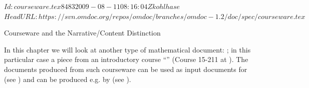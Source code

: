 \svnInfo $Id: courseware.tex 8483 2009-08-11 08:16:04Z kohlhase $
\svnKeyword $HeadURL: https://svn.omdoc.org/repos/omdoc/branches/omdoc-1.2/doc/spec/courseware.tex $

\begin{tchapter}[id=courseware]{Courseware and the Narrative/Content Distinction}

In this chapter we will look at another type of mathematical document:
{}; in this particular case a piece from an introductory
course ``{}''
(Course 15-211 at {}). The {\omdoc} documents
produced from such courseware can be used as input documents for {\activemath}
(see {}) and can be produced e.g. by {\cpoint} (see
{}).


\end{tchapter}
